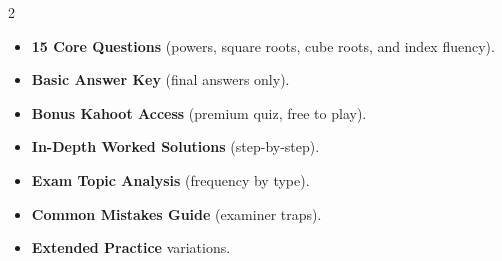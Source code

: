 \documentclass[11pt,a4paper]{article}
\newcommand{\FullReleaseDate}{April 30, 2026}
\begin{document}
\vspace{8pt}

\begin{multicols}{2}
  \begin{tcolorbox}[card, title=\sffamily\bfseries\textcolor{white}{\faHandPointDown\ TODAY (Simplified Version)}, colbacktitle=mainblue, boxed title style={sharp corners, boxrule=0pt}]
    \begin{itemize}[leftmargin=1.2em, itemsep=2pt]
      \item \small \textbf{15 Core Questions} (powers, square roots, cube roots, and index fluency).
      \item \small \textbf{Basic Answer Key} (final answers only).
      \item \small \textbf{Bonus Kahoot Access} (premium quiz, free to play).
    \end{itemize}
  \end{tcolorbox}

  \columnbreak

  \begin{tcolorbox}[card, title=\sffamily\bfseries\textcolor{white}{\faRocket\ ON \FullReleaseDate\ (Full Upgrade)}, colbacktitle=mainblue, boxed title style={sharp corners, boxrule=0pt}]
    \begin{itemize}[leftmargin=1.2em, itemsep=2pt]
      \item \small \textbf{In-Depth Worked Solutions} (step-by-step).
      \item \small \textbf{Exam Topic Analysis} (frequency by type).
      \item \small \textbf{Common Mistakes Guide} (examiner traps).
      \item \small \textbf{Extended Practice} variations.
    \end{itemize}
  \end{tcolorbox}
\end{multicols}
\end{document}
